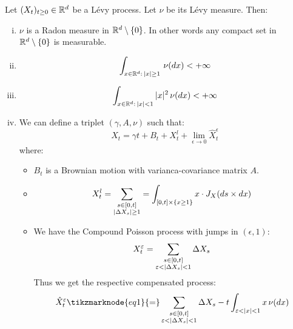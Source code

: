 \begin{definition}
    Let $(X_t)_{t\geq0}\in\R^d$ be a Lévy process. Let $\nu$ be its Lévy measure.
    Then: 
    \begin{enumerate}[i)]
        \item $\nu$ is a Radon measure in $\R^d\setminus\{0\}$. In other words
            any compact set in $\R^d\setminus\{0\}$ is measurable.
        \item \[ \int_{x\in\R^d: \, |x|\geq1} \, \nu(dx) < +\infty \]
        \item \[ \int_{x\in\R^d: \, |x|<1} |x|^2 \, \nu(dx) < +\infty \]
        \item We can define a triplet $(\gamma, A, \nu)$ such that:
            \[ X_t = \gamma t + B_t + X_t^l + \lim_{\epsilon\to0}
            \hat{X}_t^{\epsilon} \]
            where:
            \begin{itemize}
                \item $B_t$ is a Brownian motion with varianca-covariance matrix
                    $A$.
                \item \[ X_t^l = \sum_{\begin{subarray}{c}
                    s\in [0,t] \\
                    |\Delta X_s| \geq 1 
                \end{subarray}} = \int_{[0,t]\times \{x \geq 1\}} x \cdot
                J_X(ds \times dx) \]
                \item We have the Compound Poisson process with jumps in 
                $(\epsilon, 1)$:
                \[ X^\epsilon_t = \sum_{\begin{subarray}{c}
                    s\in[0,t] \\ \epsilon < |\Delta X_s| < 1
                \end{subarray}} \Delta X_s \]
                Thus we get the respective compensated process:
                \begin{align*}
                    \hat{X}^\epsilon_t & \tikzmarknode{eq1}{=} \sum_{
                        \begin{subarray}{c}
                           s\in[0,t] \\ \epsilon < |\Delta X_s| < 1 
                        \end{subarray}
                    } \Delta X_s - t \int_{\epsilon
                    < |x| < 1} x \, \nu(dx) \\

\end{align*}
\end{itemize}
\end{enumerate}
\end{definition}
